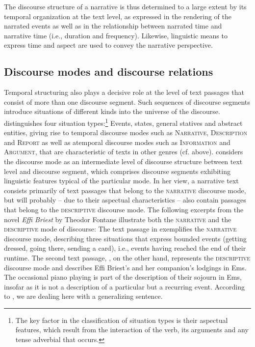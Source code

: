 \documentclass[output=paper,colorlinks,citecolor=brown]{langscibook}
\begin{document}
The discourse structure of a narrative is thus determined to a large extent by its temporal organization at the text level, as expressed in the rendering of the narrated events as well as in the relationship between narrated time and narrative time (i.e., duration and frequency). Likewise, linguistic means to express time and aspect are used to convey the narrative perspective.

\subsection{Discourse modes and discourse relations}\label{sec:1:3}
Temporal structuring also plays a decisive role at the level of text passages that consist of more than one discourse segment. Such sequences of discourse segments introduce situations of different kinds into the universe of the discourse.  \citet{Smith2003} distinguishes four situation types:\footnote{The key factor in the classification of situation types is their aspectual features, which result from the interaction of the verb, its arguments and any tense adverbial that occurs.} Events, states, general statives and abstract entities, giving rise to temporal discourse modes such as \textsc{Narrative, Description} and \textsc{Report} as well as atemporal discourse modes such as \textsc{Information} and \textsc{Argument}, that are characteristic of texts in other genres (cf. above). \citet{Smith2003} considers the discourse mode as an intermediate level of discourse structure between text level and discourse segment, which comprises discourse segments exhibiting linguistic features typical of the particular mode. In her view, a narrative text consists primarily of text passages that belong to the \textsc{narrative} discourse mode, but will probably -- due to their aspectual characteristics -- also contain passages that belong to the \textsc{descriptive} discourse mode. The following excerpts from the novel \textit{Effi Briest} by Theodor Fontane illustrate both the \textsc{narrative} and the \textsc{descriptive} mode of discourse: The text passage in  exemplifies the \textsc{narrative} discourse mode, describing three situations that express bounded events (getting dressed, going there, sending a card), i.e., events having reached the end of their runtime. The second text passage, , on the other hand, represents the \textsc{descriptive} discourse mode and describes Effi Briest's and her companion's lodgings in Ems. The occasional piano playing is part of the description of their sojourn in Ems, insofar as it is not a description of a particular but a recurring event. According to \citet{Smith2003}, we are dealing here with a generalizing sentence. 
\end{document}
